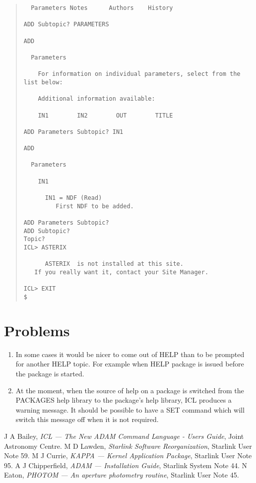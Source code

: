 \begin{quote}
\begin{verbatim}
  Parameters Notes      Authors    History 
  
ADD Subtopic? PARAMETERS
  
ADD 
  
  Parameters 
  
    For information on individual parameters, select from the list below: 
  
    Additional information available: 
  
    IN1        IN2        OUT        TITLE 
  
ADD Parameters Subtopic? IN1 
  
ADD 
  
  Parameters 
  
    IN1 
  
      IN1 = NDF (Read) 
         First NDF to be added. 
  
ADD Parameters Subtopic? 
ADD Subtopic? 
Topic? 
ICL> ASTERIX

      ASTERIX  is not installed at this site.
   If you really want it, contact your Site Manager.

ICL> EXIT 
$
\end{verbatim}
\end{quote}
\normalsize

\section{Problems}
\label{probs}
\begin{enumerate}
\item In some cases it would be nicer to come out of HELP than to be prompted
for another HELP topic.
For example when HELP package is issued before the package is started.
\item At the moment, when the source of help on a package is switched from
the PACKAGES help library to the package's help library, ICL produces a
warning message.
It should be possible to have a SET command which will switch this message off
when it is not required.
\end{enumerate}

\begin{thebibliography}{9}
 J A Bailey, {\it ICL --- The New ADAM Command Language - Users
Guide}, Joint Astronomy Centre.
 M D Lawden, {\it Starlink Software Reorganization}, Starlink
User Note 59.
 M J Currie, {\it KAPPA --- Kernel Application Package},
Starlink User Note 95.
 A J Chipperfield, {\it ADAM --- Installation Guide}, Starlink
System Note 44.
 N Eaton, {\it PHOTOM --- An aperture photometry routine},
Starlink User Note 45.
\end{thebibliography}

